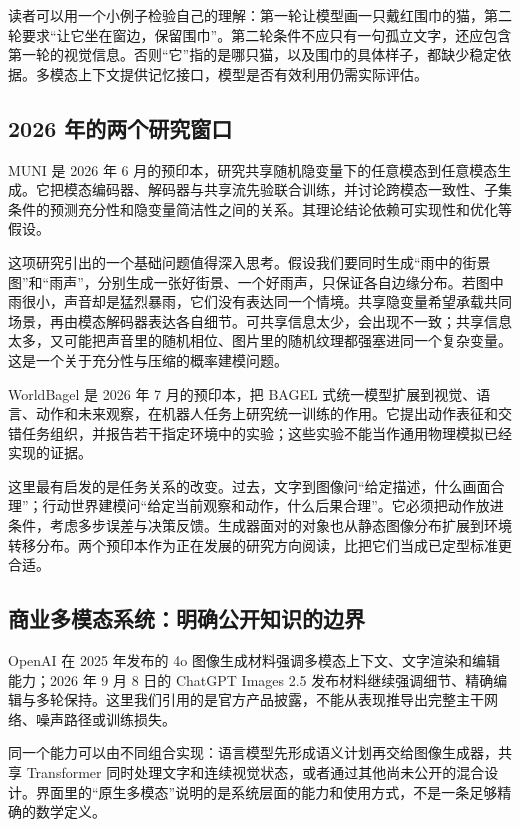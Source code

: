 读者可以用一个小例子检验自己的理解：第一轮让模型画一只戴红围巾的猫，第二轮要求“让它坐在窗边，保留围巾”。第二轮条件不应只有一句孤立文字，还应包含第一轮的视觉信息。否则“它”指的是哪只猫，以及围巾的具体样子，都缺少稳定依据。多模态上下文提供记忆接口，模型是否有效利用仍需实际评估。

\subsection{2026 年的两个研究窗口}

MUNI 是 2026 年 6 月的预印本，研究共享随机隐变量下的任意模态到任意模态生成。它把模态编码器、解码器与共享流先验联合训练，并讨论跨模态一致性、子集条件的预测充分性和隐变量简洁性之间的关系。其理论结论依赖可实现性和优化等假设。\cite{a_muni}

这项研究引出的一个基础问题值得深入思考。假设我们要同时生成“雨中的街景图”和“雨声”，分别生成一张好街景、一个好雨声，只保证各自边缘分布。若图中雨很小，声音却是猛烈暴雨，它们没有表达同一个情境。共享隐变量希望承载共同场景，再由模态解码器表达各自细节。可共享信息太少，会出现不一致；共享信息太多，又可能把声音里的随机相位、图片里的随机纹理都强塞进同一个复杂变量。这是一个关于充分性与压缩的概率建模问题。

WorldBagel 是 2026 年 7 月的预印本，把 BAGEL 式统一模型扩展到视觉、语言、动作和未来观察，在机器人任务上研究统一训练的作用。它提出动作表征和交错任务组织，并报告若干指定环境中的实验；这些实验不能当作通用物理模拟已经实现的证据。\cite{a_worldbagel}

这里最有启发的是任务关系的改变。过去，文字到图像问“给定描述，什么画面合理”；行动世界建模问“给定当前观察和动作，什么后果合理”。它必须把动作放进条件，考虑多步误差与决策反馈。生成器面对的对象也从静态图像分布扩展到环境转移分布。两个预印本作为正在发展的研究方向阅读，比把它们当成已定型标准更合适。

\subsection{商业多模态系统：明确公开知识的边界}

OpenAI 在 2025 年发布的 4o 图像生成材料强调多模态上下文、文字渲染和编辑能力；2026 年 9 月 8 日的 ChatGPT Images 2.5 发布材料继续强调细节、精确编辑与多轮保持。这里我们引用的是官方产品披露，不能从表现推导出完整主干网络、噪声路径或训练损失。\cite{a_gptimage,a_images25}

同一个能力可以由不同组合实现：语言模型先形成语义计划再交给图像生成器，共享 Transformer 同时处理文字和连续视觉状态，或者通过其他尚未公开的混合设计。界面里的“原生多模态”说明的是系统层面的能力和使用方式，不是一条足够精确的数学定义。

